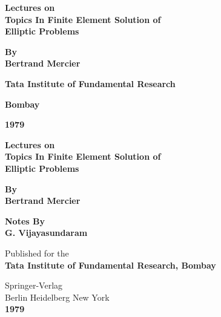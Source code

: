 \thispagestyle{empty}
\vfill
\begin{center}
{\Large\bf Lectures on}\\[5pt]
{\Large\bf Topics In Finite Element Solution of}\\[5pt]
{\Large\bf Elliptic Problems}
\vfill

{\bf By}\\[5pt]
{\large\bf Bertrand Mercier}
\vfill

{\bf Tata Institute of Fundamental Research}

{\bf Bombay}

{\bf 1979}
\end{center}

\eject

\thispagestyle{empty}

\begin{center}
{\Large\bf Lectures on}\\[5pt]
{\Large\bf Topics In Finite Element Solution of}\\[5pt]
{\Large\bf Elliptic Problems}
\vfill

{\bf By}\\[5pt]
{\large\bf Bertrand Mercier}
\vfill

{\bf Notes By}\\[5pt]
{\large\bf G. Vijayasundaram}
\vfill

{Published for the}\\[5pt]
{\bf Tata Institute of Fundamental Research, Bombay}
\vfill

{Springer-Verlag}\\
{Berlin Heidelberg New York}\\
{\bf 1979}
\end{center}

\eject

\thispagestyle{empty}

